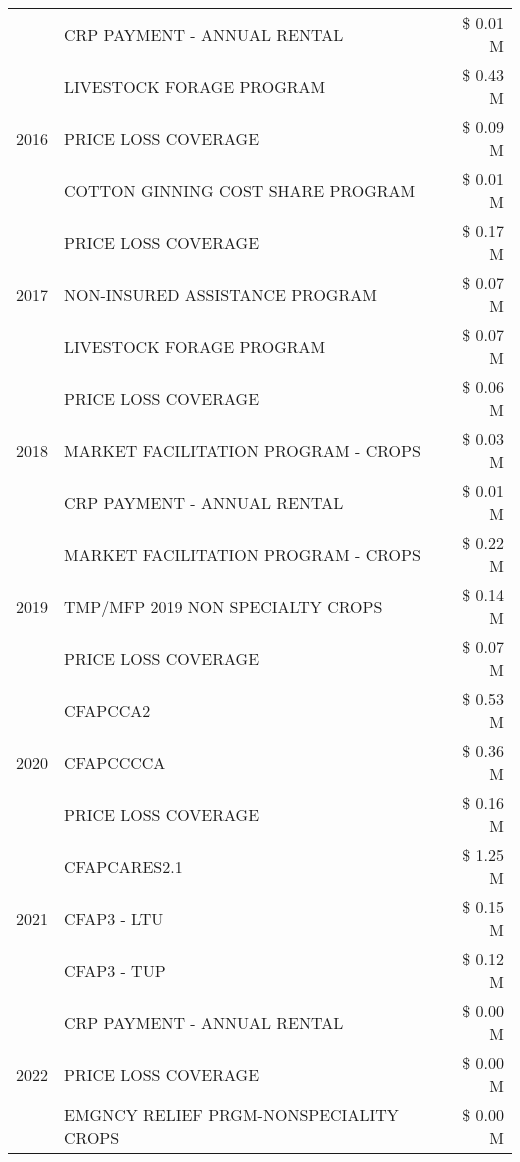 \begin{tabular}{llr}
 & CRP PAYMENT - ANNUAL RENTAL & \$ 0.01 M \\
\cline{1-3}
\multirow[t]{3}{*}{2016} & LIVESTOCK FORAGE PROGRAM & \$ 0.43 M \\
 & PRICE LOSS COVERAGE & \$ 0.09 M \\
 & COTTON GINNING COST SHARE PROGRAM & \$ 0.01 M \\
\cline{1-3}
\multirow[t]{3}{*}{2017} & PRICE LOSS COVERAGE & \$ 0.17 M \\
 & NON-INSURED ASSISTANCE PROGRAM & \$ 0.07 M \\
 & LIVESTOCK FORAGE PROGRAM & \$ 0.07 M \\
\cline{1-3}
\multirow[t]{3}{*}{2018} & PRICE LOSS COVERAGE & \$ 0.06 M \\
 & MARKET FACILITATION PROGRAM - CROPS & \$ 0.03 M \\
 & CRP PAYMENT - ANNUAL RENTAL & \$ 0.01 M \\
\cline{1-3}
\multirow[t]{3}{*}{2019} & MARKET FACILITATION PROGRAM - CROPS & \$ 0.22 M \\
 & TMP/MFP 2019 NON SPECIALTY CROPS & \$ 0.14 M \\
 & PRICE LOSS COVERAGE & \$ 0.07 M \\
\cline{1-3}
\multirow[t]{3}{*}{2020} & CFAPCCA2 & \$ 0.53 M \\
 & CFAPCCCCA & \$ 0.36 M \\
 & PRICE LOSS COVERAGE & \$ 0.16 M \\
\cline{1-3}
\multirow[t]{3}{*}{2021} & CFAPCARES2.1 & \$ 1.25 M \\
 & CFAP3 - LTU & \$ 0.15 M \\
 & CFAP3 - TUP & \$ 0.12 M \\
\cline{1-3}
\multirow[t]{3}{*}{2022} & CRP PAYMENT - ANNUAL RENTAL & \$ 0.00 M \\
 & PRICE LOSS COVERAGE & \$ 0.00 M \\
 & EMGNCY RELIEF PRGM-NONSPECIALITY CROPS & \$ 0.00 M \\
\cline{1-3}
\bottomrule
\end{tabular}
